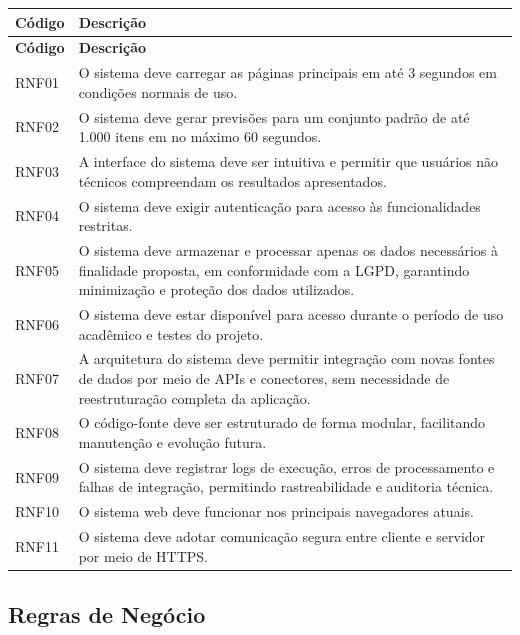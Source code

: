 \documentclass[12pt,a4paper]{article}
\newcommand{\rnf}[2]{#1 & #2 \\\midrule}
\begin{document}
\begin{center}
\begin{longtable}{p{} p{}}
\toprule
\textbf{Código} & \textbf{Descrição} \\
\midrule
\endfirsthead
\toprule
\textbf{Código} & \textbf{Descrição} \\
\midrule
\endhead
\rnf{RNF01}	{O sistema deve carregar as páginas principais em até 3 segundos em condições normais de uso.}
\rnf{RNF02}	{O sistema deve gerar previsões para um conjunto padrão de até 1.000 itens em no máximo 60 segundos.}
\rnf{RNF03}	{A interface do sistema deve ser intuitiva e permitir que usuários não técnicos compreendam os resultados apresentados.}
\rnf{RNF04}	{O sistema deve exigir autenticação para acesso às funcionalidades restritas.}
\rnf{RNF05}	{O sistema deve armazenar e processar apenas os dados necessários à finalidade proposta, em conformidade com a LGPD, garantindo minimização e proteção dos dados utilizados.}
\rnf{RNF06}	{O sistema deve estar disponível para acesso durante o período de uso acadêmico e testes do projeto.}
\rnf{RNF07}	{A arquitetura do sistema deve permitir integração com novas fontes de dados por meio de APIs e conectores, sem necessidade de reestruturação completa da aplicação.}
\rnf{RNF08}	{O código-fonte deve ser estruturado de forma modular, facilitando manutenção e evolução futura.}
\rnf{RNF09}	{O sistema deve registrar logs de execução, erros de processamento e falhas de integração, permitindo rastreabilidade e auditoria técnica.}
\rnf{RNF10}	{O sistema web deve funcionar nos principais navegadores atuais.}
\rnf{RNF11} {O sistema deve adotar comunicação segura entre cliente e servidor por meio de HTTPS.}
\bottomrule
\end{longtable}
\end{center}

\subsection{Regras de Negócio}
\end{document}
